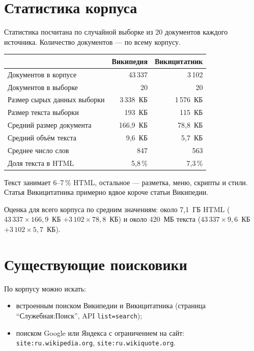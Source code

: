 \documentclass[12pt,a4paper,oneside,fleqn]{article}
\begin{document}
\pagebreak

\section{Статистика корпуса}

Статистика посчитана по случайной выборке из 20 документов каждого источника. Количество документов --- по всему корпусу.

\begin{center}
\begin{tabular}{|l|r|r|}
\hline
 & \textbf{Википедия} & \textbf{Викицитатник} \\
\hline
Документов в корпусе & 43\,337 & 3\,102 \\
Документов в выборке & 20 & 20 \\
Размер сырых данных выборки & 3\,338~КБ & 1\,576~КБ \\
Размер текста выборки & 193~КБ & 115~КБ \\
Средний размер документа & 166,9~КБ & 78,8~КБ \\
Средний объём текста & 9,6~КБ & 5,7~КБ \\
Среднее число слов & 847 & 563 \\
Доля текста в HTML & 5,8\,\% & 7,3\,\% \\
\hline
\end{tabular}
\end{center}

Текст занимает 6--7\,\% HTML, остальное --- разметка, меню, скрипты и стили. Статья Викицитатника примерно вдвое короче статьи Википедии.

Оценка для всего корпуса по средним значениям: около 7,1~ГБ HTML ($43\,337 \times 166{,}9$~КБ $+ 3\,102 \times 78{,}8$~КБ) и около 420~МБ текста ($43\,337 \times 9{,}6$~КБ $+ 3\,102 \times 5{,}7$~КБ).

\pagebreak

\section{Существующие поисковики}

По корпусу можно искать:
\begin{itemize}
    \item встроенным поиском Википедии и Викицитатника (страница \enquote{Служебная:Поиск}, API \texttt{list=search});
    \item поиском Google или Яндекса с ограничением на сайт: \texttt{site:ru.wikipedia.org}, \texttt{site:ru.wikiquote.org}.
\end{itemize}
\end{document}
